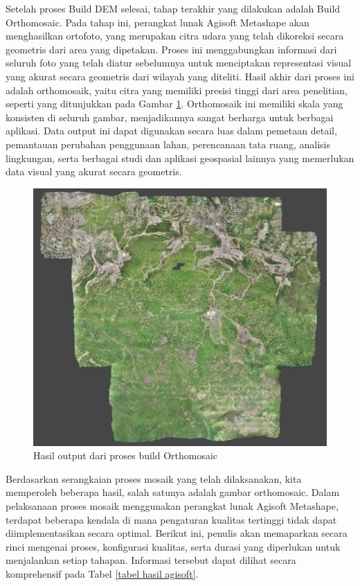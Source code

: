 \par Setelah proses Build DEM selesai, tahap terakhir yang dilakukan adalah Build Orthomosaic. Pada tahap ini, perangkat lunak Agisoft Metashape akan menghasilkan ortofoto, yang merupakan citra udara yang telah dikoreksi secara geometris dari area yang dipetakan. Proses ini menggabungkan informasi dari seluruh foto yang telah diatur sebelumnya untuk menciptakan representasi visual yang akurat secara geometris dari wilayah yang diteliti. Hasil akhir dari proses ini adalah orthomosaik, yaitu citra yang memiliki presisi tinggi dari area penelitian, seperti yang ditunjukkan pada Gambar \ref{orthomosaic}. Orthomosaik ini memiliki skala yang konsisten di seluruh gambar, menjadikannya sangat berharga untuk berbagai aplikasi. Data output ini dapat digunakan secara luas dalam pemetaan detail, pemantauan perubahan penggunaan lahan, perencanaan tata ruang, analisis lingkungan, serta berbagai studi dan aplikasi geospasial lainnya yang memerlukan data visual yang akurat secara geometris.

\begin{figure} [H]
    \centering
    \includegraphics[width=1\linewidth]{image/Orthomosaic.png}
    \caption{Hasil output dari proses build Orthomosaic}
    \label{orthomosaic}
\end{figure}

\par Berdasarkan serangkaian proses mosaik yang telah dilaksanakan, kita memperoleh beberapa hasil, salah satunya adalah gambar orthomosaic. Dalam pelaksanaan proses mosaik menggunakan perangkat lunak Agisoft Metashape, terdapat beberapa kendala di mana pengaturan kualitas tertinggi tidak dapat diimplementasikan secara optimal. Berikut ini, penulis akan memaparkan secara rinci mengenai proses, konfigurasi kualitas, serta durasi yang diperlukan untuk menjalankan setiap tahapan. Informasi tersebut dapat dilihat secara komprehensif pada Tabel \ref{tabel hasil agisoft}.

